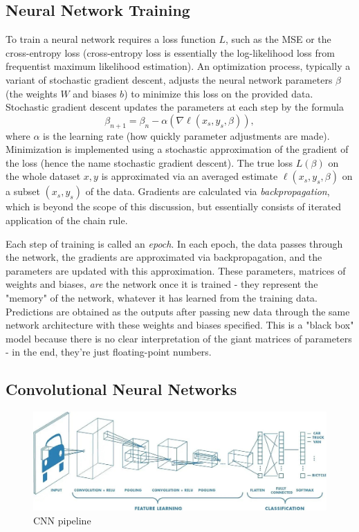 \documentclass[12pt]{article}
\begin{document}
	
\subsection{Neural Network Training}


To train a neural network requires a loss function $L$, such as the MSE or the cross-entropy loss (cross-entropy loss is essentially the log-likelihood loss from frequentist maximum likelihood estimation). An optimization process, typically a variant of stochastic gradient descent, adjusts the neural network parameters $\beta$ (the weights $W$ and biases $b$) to minimize this loss on the provided data. Stochastic gradient descent updates the parameters at each step by the formula
$$
\beta_{n+1} = \beta_n - \alpha (\nabla \ell(x_s, y_s, \beta)),
$$
where $\alpha$ is the learning rate (how quickly parameter adjustments are made). Minimization is implemented using a stochastic approximation of the gradient of the loss (hence the name stochastic gradient descent). The true loss $L(\beta)$ on the whole dataset $x, y$ is approximated via an averaged estimate $\ell(x_s, y_s, \beta)$ on a subset $(x_s, y_s)$ of the data. Gradients are calculated via \textit{backpropagation}, which is beyond the scope of this discussion, but essentially consists of iterated application of the chain rule. 

Each step of training is called an \textit{epoch}. In each epoch, the data passes through the network, the gradients are approximated via backpropagation, and the parameters are updated with this approximation. These parameters, matrices of weights and biases, \textit{are} the network once it is trained - they represent the "memory" of the network, whatever it has learned from the training data. Predictions are obtained as the outputs after passing new data through the same network architecture with these weights and biases specified. This is a "black box" model because there is no clear interpretation of the giant matrices of parameters - in the end, they're just floating-point numbers. 



\subsection{Convolutional Neural Networks }

\begin{figure}[H]
	\centering
	\includegraphics[width=.8\textwidth]{../Images/big-pic-cnn.jpg}
	\caption{CNN pipeline \cite{eli5CNN}}
	\label{fig:cnn-pipeline}
\end{figure}
\end{document}
